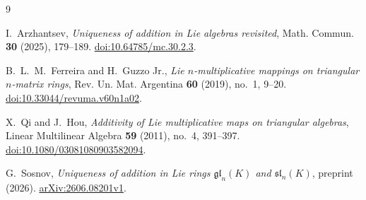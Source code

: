 \documentclass[11pt]{article}
\theoremstyle{definition}
\begin{document}
\begin{thebibliography}{9}
\raggedright
{}
I.~Arzhantsev, \emph{Uniqueness of addition in Lie algebras revisited},
Math. Commun. \textbf{30} (2025), 179--189.
\href{https://doi.org/10.64785/mc.30.2.3}{doi:10.64785/mc.30.2.3}.

B.~L.~M.~Ferreira and H.~Guzzo Jr.,
\emph{Lie $n$-multiplicative mappings on triangular $n$-matrix rings},
Rev. Un. Mat. Argentina \textbf{60} (2019), no.~1, 9--20.
\href{https://doi.org/10.33044/revuma.v60n1a02}{doi:10.33044/revuma.v60n1a02}.

X.~Qi and J.~Hou,
\emph{Additivity of Lie multiplicative maps on triangular algebras},
Linear Multilinear Algebra \textbf{59} (2011), no.~4, 391--397.
\href{https://doi.org/10.1080/03081080903582094}{doi:10.1080/03081080903582094}.

G.~Sosnov, \emph{Uniqueness of addition in Lie rings $\mathfrak{gl}_n(K)$ and $\mathfrak{sl}_n(K)$}, preprint (2026).
\href{https://arxiv.org/abs/2606.08201}{arXiv:2606.08201v1}.
\end{thebibliography}
\end{document}
